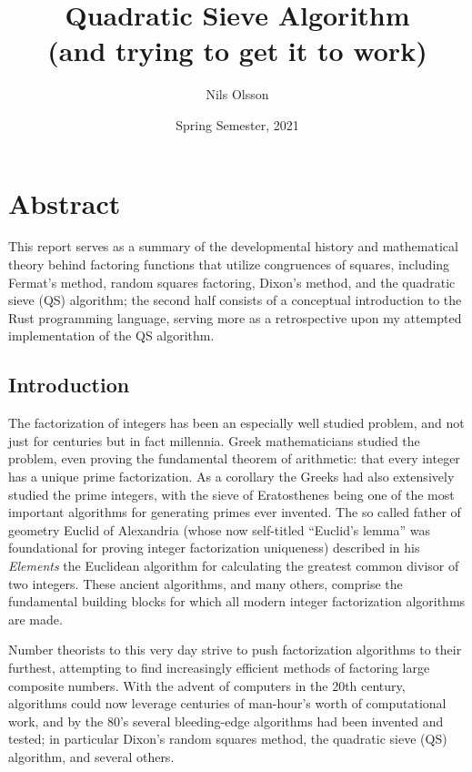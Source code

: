 \documentclass{report}
\begin{document}
\title{%
    Quadratic Sieve Algorithm \\[1em]
    {\large (and trying to get it to work)}
}
\author{Nils Olsson}
\date{Spring Semester, 2021}
\maketitle

{
    \hypersetup{linkcolor=.}
    \tableofcontents
}


\pagebreak

\chapter{Abstract}

This report serves as a summary of the developmental history and mathematical theory behind
factoring functions that utilize congruences of squares, including Fermat's method, random squares
factoring, Dixon's method, and the quadratic sieve (QS) algorithm; the second half consists of a
conceptual introduction to the Rust programming language, serving more as a retrospective upon my
attempted implementation of the QS algorithm.

\section{Introduction}

The factorization of integers has been an especially well studied problem,
and not just for centuries but in fact millennia.
Greek mathematicians studied the problem, even proving the fundamental theorem
of arithmetic: that every integer has a unique prime factorization.
As a corollary the Greeks had also extensively studied the prime integers,
with the sieve of Eratosthenes being one of the most important algorithms
for generating primes ever invented.
The so called father of geometry Euclid of Alexandria (whose now self-titled
``Euclid's lemma'' was foundational for proving integer factorization
uniqueness) described in his \emph{Elements} the Euclidean algorithm for
calculating the greatest common divisor of two integers.
These ancient algorithms, and many others, comprise the fundamental building
blocks for which all modern integer factorization algorithms are made.

Number theorists to this very day strive to push factorization algorithms to their furthest,
attempting to find increasingly efficient methods of factoring large composite numbers.
With the advent of computers in the 20th century, algorithms could now leverage centuries of
man-hour's worth of computational work, and by the 80's several bleeding-edge algorithms
had been invented and tested; in particular Dixon's random squares method, the quadratic sieve (QS)
algorithm, and several others.
\end{document}
